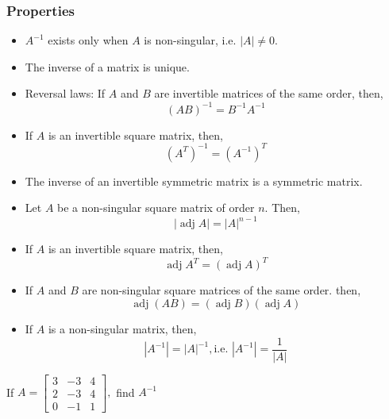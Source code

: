 \subsubsection{Properties}
\begin{itemize}
	\item  $A^{-1}$ exists only when $A$ is non-singular, i.e. $|A| \neq 0$.
	\item The inverse of a matrix is unique.
	\item Reversal laws: If $A$ and $B$ are invertible matrices of the same order, then,
	$$
	(A B)^{-1}=B^{-1} A^{-1}
	$$
	\item If $A$ is an invertible square matrix, then, $$\left(A^{T}\right)^{-1}= \left(A^{-1}\right)^{T}$$
   \item The inverse of an invertible symmetric matrix is a symmetric matrix.
	\item Let $A$ be a non-singular square matrix of order $n$. Then,
	$$
	|\operatorname{adj} A|=|A|^{n-1}
	$$
	\item If $A$ is an invertible square matrix, then, $$\operatorname{adj} A^{T}=(\operatorname{adj} A)^{T}$$
	\item If $A$ and $B$ are non-singular square matrices of the same order. then, $$\operatorname{adj}(A B)=(\operatorname{adj} B)(\operatorname{adj} A)$$
	\item If $A$ is a non-singular matrix, then,
	$$
	\left|A^{-1}\right|=|A|^{-1}, \text {i.e. }\left|A^{-1}\right|=\frac{1}{|A|}
	$$
\end{itemize}
\begin{exercise}
	If $A=\left[\begin{array}{rrr}3 & -3 & 4 \\ 2 & -3 & 4 \\ 0 & -1 & 1\end{array}\right],$ find $A^{-1}$\end{exercise}
